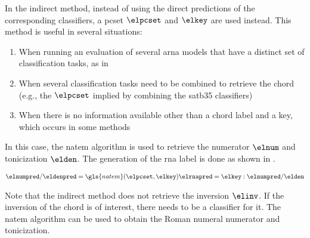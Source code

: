 

In the indirect method, instead of using the direct
predictions of the corresponding classifiers, a \gls{pcset}
$\elpcset$ and $\elkey$ are used instead. This method is
useful in several situations: 
\begin{enumerate}
    \item When running an evaluation of several \gls{arna}
    models that have a distinct set of classification tasks,
    as in 
    \item When several classification tasks need to be
    combined to retrieve the chord (e.g., the $\elpcset$
    implied by combining the \gls{satb35} classifiers)
    \item When there is no information available other than
    a chord label and a key, which occurs in some methods
\end{enumerate}

In this case, the \gls{natem} algorithm is used to retrieve
the numerator $\elnum$ and tonicization $\elden$. The
generation of the \gls{rna} label is done as shown in
.

\begin{equation}
    \label{eq:rna_indirect}
    \begin{split}
        \elnumpred / \eldenpred = \gls{natem}(\elpcset, \elkey)
        \elrnapred = \elkey : \elnumpred / \elden 
    \end{split}
\end{equation}

Note that the indirect method does not retrieve the
inversion $\elinv$. If the inversion of the chord is of
interest, there needs to be a classifier for it. The
\gls{natem} algorithm can be used to obtain the Roman
numeral numerator and tonicization.




